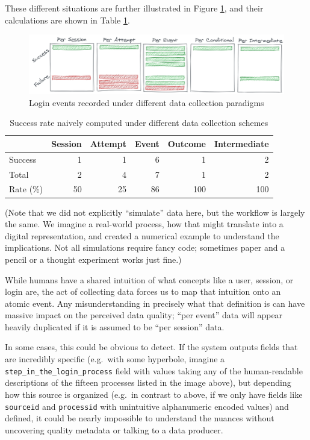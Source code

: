 \documentclass[
]{krantz}
\begin{document}
These different situations are further illustrated in Figure \ref{fig:login-rate}, and their calculations are shown in Table \ref{tab:login-rate-tbl}.

\begin{figure}

{\centering \includegraphics[width=0.9\linewidth]{figures/data-dall/login-rate} 

}

\caption{Login events recorded under different data collection paradigms}\label{fig:login-rate}
\end{figure}

\begin{table}

\caption{\label{tab:login-rate-tbl}Success rate naively computed under different data collection schemes}
\centering
\begin{tabular}[t]{l|r|r|r|r|r}
\hline
  & Session & Attempt & Event & Outcome & Intermediate\\
\hline
Success & 1 & 1 & 6 & 1 & 2\\
\hline
Total & 2 & 4 & 7 & 1 & 2\\
\hline
Rate (\%) & 50 & 25 & 86 & 100 & 100\\
\hline
\end{tabular}
\end{table}

(Note that we did not explicitly ``simulate'' data here, but the workflow is largely the same. We imagine a real-world process, how that might translate into a digital representation, and created a numerical example to understand the implications. Not all simulations require fancy code; sometimes paper and a pencil or a thought experiment works just fine.)

While humans have a shared intuition of what concepts like a user, session, or login are, the act of collecting data forces us to map that intuition onto an atomic event.
Any misunderstanding in precisely what that definition is can have massive impact on the perceived data quality; ``per event'' data will appear heavily duplicated if it is assumed to be ``per session'' data.

In some cases, this could be obvious to detect.
If the system outputs fields that are incredibly specific (e.g.~with some hyperbole, imagine a \texttt{step\_in\_the\_login\_process} field with values taking any of the human-readable descriptions of the fifteen processes listed in the image above), but depending how this source is organized (e.g.~in contrast to above, if we only have fields like \texttt{sourceid} and \texttt{processid} with unintuitive alphanumeric encoded values) and defined, it could be nearly impossible to understand the nuances without uncovering quality metadata or talking to a data producer.
\end{document}
